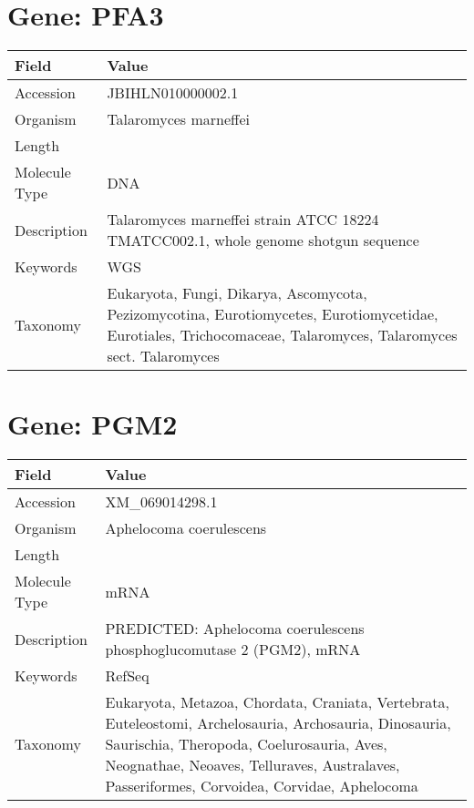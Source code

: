 \documentclass[10pt]{article}
\begin{document}
\section*{Gene: PFA3}
{\footnotesize
\begin{longtable}{>{\raggedright\arraybackslash}p{4.5cm} >{\raggedright\arraybackslash}p{11.5cm}}
\textbf{Field} & \textbf{Value} \\
\hline
Accession & JBIHLN010000002.1 \\
Organism & Talaromyces marneffei \\
Length & 6416306 \\
Molecule Type & DNA \\
Description & Talaromyces marneffei strain ATCC 18224 TMATCC002.1, whole genome shotgun sequence \\
Keywords & WGS \\
Taxonomy & Eukaryota, Fungi, Dikarya, Ascomycota, Pezizomycotina, Eurotiomycetes, Eurotiomycetidae, Eurotiales, Trichocomaceae, Talaromyces, Talaromyces sect. Talaromyces \\
\end{longtable}
}


\section*{Gene: PGM2}
{\footnotesize
\begin{longtable}{>{\raggedright\arraybackslash}p{4.5cm} >{\raggedright\arraybackslash}p{11.5cm}}
\textbf{Field} & \textbf{Value} \\
\hline
Accession & XM\_069014298.1 \\
Organism & Aphelocoma coerulescens \\
Length & 4924 \\
Molecule Type & mRNA \\
Description & PREDICTED: Aphelocoma coerulescens phosphoglucomutase 2 (PGM2), mRNA \\
Keywords & RefSeq \\
Taxonomy & Eukaryota, Metazoa, Chordata, Craniata, Vertebrata, Euteleostomi, Archelosauria, Archosauria, Dinosauria, Saurischia, Theropoda, Coelurosauria, Aves, Neognathae, Neoaves, Telluraves, Australaves, Passeriformes, Corvoidea, Corvidae, Aphelocoma \\
\end{longtable}
}
\end{document}
